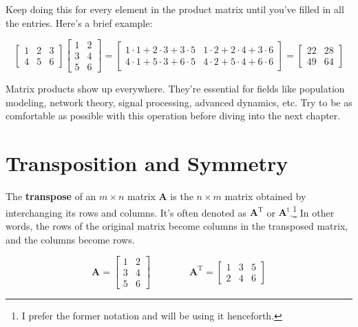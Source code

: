 \documentclass[
  letterpaper,
  DIV=11,
  numbers=noendperiod]{scrreprt}
\begin{document}
Keep doing this for every element in the product matrix until you've
filled in all the entries. Here's a brief example:

\[\begin{bmatrix}
    1 & 2 & 3 \\
    4 & 5 & 6
    \end{bmatrix}
    \begin{bmatrix}
    1 & 2 \\
    3 & 4 \\
    5 & 6
    \end{bmatrix}
    =
    \begin{bmatrix}
    1 \cdot 1 + 2 \cdot 3 + 3 \cdot 5 & 1 \cdot 2 + 2 \cdot 4 + 3 \cdot 6 \\
    4 \cdot 1 + 5 \cdot 3 + 6 \cdot 5 & 4 \cdot 2 + 5 \cdot 4 + 6 \cdot 6\end{bmatrix} = \begin{bmatrix} 22 & 28 \\ 49 & 64 \end{bmatrix}\]

Matrix products show up everywhere. They're essential for fields like
population modeling, network theory, signal processing, advanced
dynamics, etc. Try to be as comfortable as possible with this operation
before diving into the next chapter.

\hypertarget{transposition-and-symmetry}{%
\section{Transposition and Symmetry}\label{transposition-and-symmetry}}

The \textbf{transpose} of an \(m\times n\) matrix \(\textbf{A}\) is the
\(n\times m\) matrix obtained by interchanging its rows and columns.
It's often denoted as \(\textbf{A}^\text{T}\) or
\(\textbf{A}^\text{t}\).\footnote{I prefer the former notation and will
  be using it henceforth.} In other words, the rows of the original
matrix become columns in the transposed matrix, and the columns become
rows.

\[\textbf{A} = \begin{bmatrix} 1 & 2 \\ 3 & 4 \\ 5 & 6 \end{bmatrix} \qquad \qquad \textbf{A}^\text{T} = \begin{bmatrix} 1 & 3 & 5 \\ 2 & 4 & 6 \end{bmatrix}\]
\end{document}
